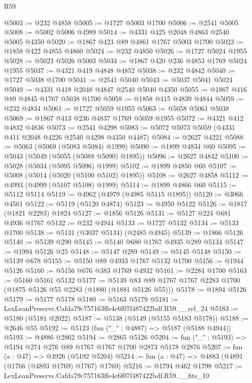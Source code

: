 \begin{lexlean}{R59}
\begin{coremodule}
@5003 := @232 @4858
@5005 := @1727 @5003 @1700
@5006 := @2541 @5005
@5008 := @5002 @5006 @4989
@5014 := @4331 @425 @2048 @4863 @2540 @5005 @4350
@5020 := @1867 @423 @89 @4861 @1767 @5003 @1700
@5023 := @1858 @422 @4855 @4860
@5024 := @232 @4850
@5026 := @1727 @5024 @1955
@5028 := @5023 @5026 @5003
@5034 := @1867 @420 @236 @4853 @1769 @5024 @1955
@5037 := @4321 @419 @4848 @4852
@5038 := @232 @4842
@5040 := @1727 @5038 @1700
@5041 := @2541 @5040
@5043 := @5037 @5041 @5024
@5049 := @4331 @418 @2048 @4847 @2540 @5040 @4350
@5055 := @1867 @416 @89 @4845 @1767 @5038 @1700
@5058 := @1858 @415 @4839 @4844
@5059 := @232 @4834
@5061 := @1727 @5059 @1955
@5063 := @5058 @5061 @5038
@5069 := @1867 @413 @236 @4837 @1769 @5059 @1955
@5072 := @4321 @412 @4832 @4836
@5073 := @2541 @4298
@5083 := @5072 @5073 @5059 (@4331 @411 @2048 @4226 @2540 @4298 @4350 @4487)
@5084 := @2627 @4221
@5088 := @5063 (@5069 (@5083 @5084) @1999)
@5090 := @1899 @4834 @60
@5095 := @5043 (@5049 (@5055 (@5088 @5090) @1895))
@5096 := @2627 @4842
@5100 := @5028 (@5034 (@5095 @5096) @1999)
@5102 := @1899 @4850 @60
@5107 := @5008 (@5014 (@5020 (@5100 @5102) @1895))
@5108 := @2627 @4858
@5112 := @4993 (@4999 (@5107 @5108) @1999)
@5114 := @1899 @4866 @60
@5115 := @5112 @5114
@5119 := @4962 (@4979 (@4985 @5115 @1895))
@5120 := @3066 @4561
@5122 := @5119 (@5120 @4874)
@5123 := @4950 @5122
@5126 := @1817 (@1821 @2283) @1824
@5127 := @1856 @5126
@5131 := @5127 @224 @681 @4936 @1767
@5132 := @232 @4944
@5133 := @1727 @5132
@5134 := @5133 @1700
@5138 := @5131 (@3037 @5134) (@2485 @4945)
@5139 := @1866 @5126
@5140 := @5139 @290
@5145 := @5140 @680 @1767 @4935 @289 @5134
@5147 := @1994 @5126 @25
@5148 := @5147 @289
@5149 := @5145 @5148
@5150 := @5139 @678
@5155 := @5150 @89 @4933 @1767 @5132 @1700
@5156 := @1944 @5126
@5160 := @5156 @676 @383 @1769 @4932
@5161 := @2284 @1700
@5163 := @5160 @5161 @5132
@5177 := @5139 @83 @89 @1767 @1767 @2283 @1700 (@1875 @5126 @55 @2283 (@1880 (@1881 @5126 @55)))
@5178 := @1894 @5126
@5179 := @5177 @5178
@5180 := @5163 @5179
@5181 := LexLeanPreserve.Cafda79c757163ffe4c6f07f487422bdf.R59.__rel_24
@5183 := @5180 (@5181 @2022)
@5187 := @5138 (@5149 (@5155 @5183 @5178))
@5188 := @2646 @55
@5192 := @5123 (fun ("_" : @4887) => @5187 (@5188 @4944))
@5193 := @4886 @2862
@5194 := @2865 @5126
@5204 := fun ("_" : @5193) => @5194 @274 @276 @89 @1767 @1767 @1700 @2873 @5178 @2876
@5207 := fun (a : @47) => @4926 (@5192 @5204)
@5214 := fun (a : @47) => @4883 (@4891 (@1766 (@4893 @1769) @1767) @1769)
@5216 := @1794 @462 @1798
@5217 := LexLeanPreserve.Cafda79c757163ffe4c6f07f487422bdf.R59.__fits_10

\end{coremodule}
\end{lexlean}
